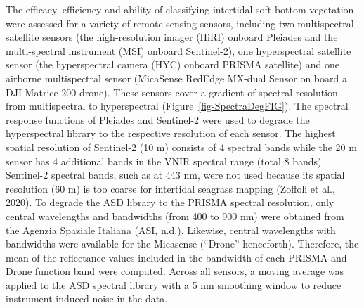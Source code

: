\documentclass[
  letterpaper,
  11pt,
  english,
  singlespacing,
  headsepline]{MastersDoctoralThesis}
\begin{document}
\begin{spacing}{1.5}
The efficacy, efficiency and ability of classifying intertidal
soft-bottom vegetation were assessed for a variety of remote-sensing
sensors, including two multispectral satellite sensors (the
high-resolution imager (HiRI) onboard Pleiades and the multi-spectral
instrument (MSI) onboard Sentinel-2), one hyperspectral satellite sensor
(the hyperspectral camera (HYC) onboard PRISMA satellite) and one
airborne multispectral sensor (MicaSense RedEdge MX-dual Sensor on board
a DJI Matrice 200 drone). These sensors cover a gradient of spectral
resolution from multispectral to hyperspectral
(Figure~\ref{fig-SpectraDegFIG}). The spectral response functions of
Pleiades and Sentinel-2 were used to degrade the hyperspectral library
to the respective resolution of each sensor. The highest spatial
resolution of Sentinel-2 (10 m) consists of 4 spectral bands while the
20 m sensor has 4 additional bands in the VNIR spectral range (total 8
bands). Sentinel-2 spectral bands, such as at 443 nm, were not used
because its spatial resolution (60 m) is too coarse for intertidal
seagrass mapping (Zoffoli et al., 2020). To degrade the ASD library to
the PRISMA spectral resolution, only central wavelengths and bandwidths
(from 400 to 900 nm) were obtained from the Agenzia Spaziale Italiana
(ASI, n.d.). Likewise, central wavelengths with bandwidths were
available for the Micasense (``Drone'' henceforth). Therefore, the mean
of the reflectance values included in the bandwidth of each PRISMA and
Drone function band were computed. Across all sensors, a moving average
was applied to the ASD spectral library with a 5 nm smoothing window to
reduce instrument-induced noise in the data.

\begin{figure}

\end{figure}
\end{spacing}
\end{document}
